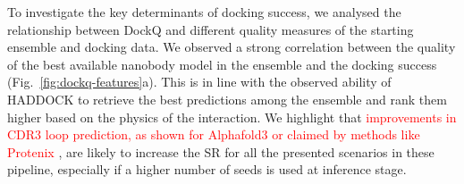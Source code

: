\documentclass[12pt]{article}
\begin{document}
To investigate the key determinants of docking success, we analysed the relationship between DockQ and different quality measures of the starting ensemble and docking data. We observed a strong correlation between the quality of the best available nanobody  model in the ensemble and the docking success (Fig.~\ref{fig:dockq-features}a). This is in line with the observed ability of HADDOCK to retrieve the best predictions among the ensemble and rank them higher based on the physics of the interaction. We highlight that \textcolor{Red}{improvements in CDR3 loop prediction, as shown for Alphafold3 or claimed by methods like Protenix \cite{Zhang2026protenix}}, are likely to increase the SR for all the presented scenarios in these pipeline, especially if a higher number of seeds is used at inference stage.
\end{document}
